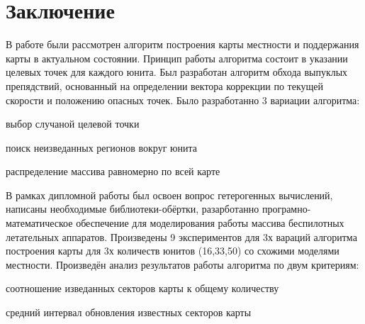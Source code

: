 \section{Заключение}

В работе были рассмотрен алгоритм построения карты местности и
поддержания карты в актуальном состоянии. Принцип работы алгоритма
состоит в указании целевых точек для каждого юнита. Был разработан
алгоритм обхода выпуклых препядствий, основанный на определении
вектора коррекции по текущей скорости и положению опасных точек.
Было разработанно 3 вариации алгоритма:

\begin{mintemize}
\item выбор случаной целевой точки
\item поиск неизведанных регионов вокруг юнита
\item распределение массива равномерно по всей карте
\end{mintemize}

В рамках дипломной работы был освоен вопрос гетерогенных вычислений,
написаны необходимые библиотеки-обёртки, разарботанно програмно-математическое
обеспечение для моделирования работы массива беспилотных 
летательных аппаратов. Произведены 9 экспериментов для 3х вараций алгоритма
построения карты для 3х количеств юнитов (16,33,50) со схожими моделями местности.
Произведён анализ результатов работы алгоритма по двум критериям:
\begin{mintemize}
\item соотношение изведанных секторов карты к общему количеству
\item средний интервал обновления известных секторов карты
\end{mintemize}
